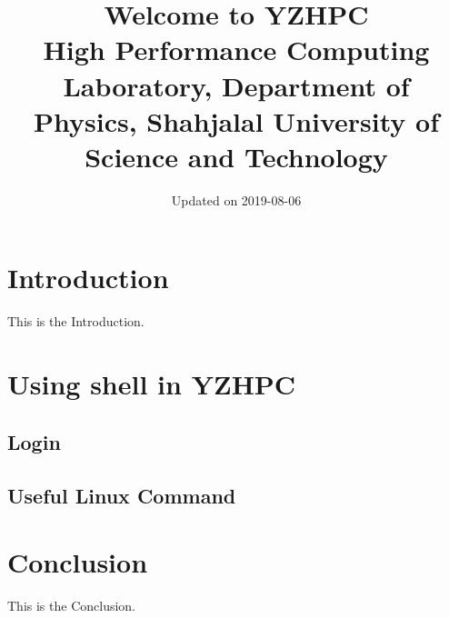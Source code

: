 \documentclass{book}
\title{Welcome to YZHPC \\ 
{\ssmall High Performance Computing Laboratory, Department of Physics, Shahjalal University of Science and Technology}
}
\date{Updated on 2019-08-06}
\begin{document}
\maketitle
\newpage


\chapter{Introduction}%
\label{cha:introduction}

This is the Introduction.


\chapter{Using shell in YZHPC}%
\label{cha:using_shell_in_yzhpc}

\section{Login}%
\label{sec:login}

\section{Useful Linux Command}%
\label{sec:useful_linux_command}



\chapter{Conclusion}%
\label{cha:conclusion}

This is the Conclusion.
\end{document}

